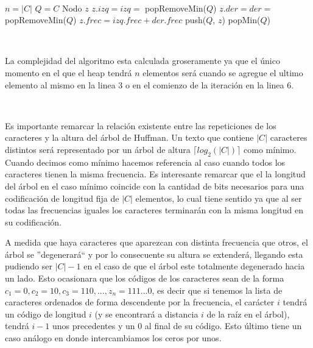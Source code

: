 ~

\begin{algorithmic}[1]
    \State $n = |C|$
    \State $Q = C$ 
      \State Nodo $z$
      \State $z.izq = izq = $ popRemoveMin($Q$) 
      \State $z.der = der = $ popRemoveMin($Q$) 
      \State $z.frec = izq.frec + der.frec$
      \State push($Q$, $z$) 
    \EndFor
    \State \Return popMin($Q$) 
 \EndFunction {}
\end{algorithmic}

~

La complejidad del algoritmo esta calculada groseramente ya que el \'unico momento en el que el heap tendr\'a $n$ elementos ser\'a cuando se agregue el ultimo elemento al mismo en la linea $3$ o en el comienzo de la iteraci\'on en la linea $6$.

~

Es importante remarcar la relaci\'on existente entre las repeticiones de los caracteres y la altura del \'arbol de Huffman. Un texto que contiene $|C|$ caracteres distintos ser\'a representado por un \'arbol de altura $\lceil log_2(|C|) \rceil$ como m\'inimo. Cuando decimos como m\'inimo hacemos referencia al caso cuando todos los caracteres tienen la misma frecuencia. Es interesante remarcar que el la longitud del \'arbol en el caso m\'inimo coincide con la cantidad de bits necesarios para una codificaci\'on de longitud fija de $|C|$ elementos, lo cual tiene sentido ya que al ser todas las frecuencias iguales los caracteres terminar\'an con la misma longitud en su codificaci\'on.

A medida que haya caracteres que aparezcan con distinta frecuencia que otros, el \'arbol se ''degenerar\'a`` y por lo consecuente su altura se extender\'a, llegando esta pudiendo ser $|C|-1$ en el caso de que el \'arbol este totalmente degenerado hacia un lado. Esto ocasionara que los c\'odigos de los caracteres sean de la forma $c_1=0, c_2=10, c_3=110, ... , z_n = 111...0$, es decir que si tenemos la lista de caracteres ordenados de forma descendente por la frecuencia, el car\'acter $i$ tendr\'a un c\'odigo de longitud $i$ (y se encontrar\'a a distancia $i$ de la ra\'iz en el \'arbol), tendr\'a $i-1$ unos precedentes y un $0$ al final de su c\'odigo. Esto \'ultimo tiene un caso an\'alogo en donde intercambiamos los ceros por unos.

